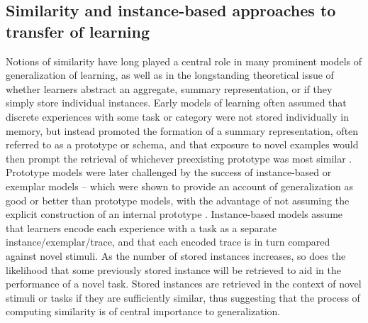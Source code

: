 \documentclass[
  12pt,
  letterpaper,
]{article}
\begin{document}
\subsection{Similarity and instance-based approaches to transfer of
learning}\label{similarity-and-instance-based-approaches-to-transfer-of-learning}

Notions of similarity have long played a central role in many prominent
models of generalization of learning, as well as in the longstanding
theoretical issue of whether learners abstract an aggregate, summary
representation, or if they simply store individual instances. Early
models of learning often assumed that discrete experiences with some
task or category were not stored individually in memory, but instead
promoted the formation of a summary representation, often referred to as
a prototype or schema, and that exposure to novel examples would then
prompt the retrieval of whichever preexisting prototype was most similar
\autocite{posnerGenesisAbstractIdeas1968}. Prototype models were later
challenged by the success of instance-based or exemplar models -- which
were shown to provide an account of generalization as good or better
than prototype models, with the advantage of not assuming the explicit
construction of an internal prototype
\autocites{estesClassificationCognition1994,hintzmanMINERVASimulationModel1984,medinContextTheoryClassification1978}[
]{nosofskyAttentionSimilarityIdentificationcategorization1986}.
Instance-based models assume that learners encode each experience with a
task as a separate instance/exemplar/trace, and that each encoded trace
is in turn compared against novel stimuli. As the number of stored
instances increases, so does the likelihood that some previously stored
instance will be retrieved to aid in the performance of a novel task.
Stored instances are retrieved in the context of novel stimuli or tasks
if they are sufficiently similar, thus suggesting that the process of
computing similarity is of central importance to generalization.
\end{document}
